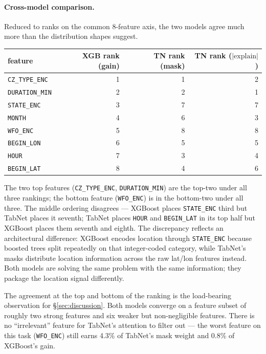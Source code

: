 \documentclass[11pt]{article}
\begin{document}
\paragraph{Cross-model comparison.}\label{sec:interp-compare}

Reduced to ranks on the common 8-feature axis, the two models agree
much more than the distribution shapes suggest.

\begin{center}
\small
\begin{tabular}{lrrr}
\toprule
feature & XGB rank (gain) & TN rank (mask) & TN rank ($|\mathrm{explain}|$) \\
\midrule
\texttt{CZ\_TYPE\_ENC}  & 1 & 1 & 2 \\
\texttt{DURATION\_MIN}  & 2 & 2 & 1 \\
\texttt{STATE\_ENC}     & 3 & 7 & 7 \\
\texttt{MONTH}          & 4 & 6 & 3 \\
\texttt{WFO\_ENC}       & 5 & 8 & 8 \\
\texttt{BEGIN\_LON}     & 6 & 5 & 5 \\
\texttt{HOUR}           & 7 & 3 & 4 \\
\texttt{BEGIN\_LAT}     & 8 & 4 & 6 \\
\bottomrule
\end{tabular}
\end{center}

The two top features (\texttt{CZ\_TYPE\_ENC},
\texttt{DURATION\_MIN}) are the top-two under all three rankings;
the bottom feature (\texttt{WFO\_ENC}) is in the bottom-two under
all three. The middle ordering disagrees --- XGBoost places
\texttt{STATE\_ENC} third but TabNet places it seventh; TabNet
places \texttt{HOUR} and \texttt{BEGIN\_LAT} in its top half but
XGBoost places them seventh and eighth. The discrepancy reflects an
architectural difference: XGBoost encodes location through
\texttt{STATE\_ENC} because boosted trees split repeatedly on that
integer-coded category, while TabNet's masks distribute location
information across the raw lat/lon features instead. Both models
are solving the same problem with the same information; they
package the location signal differently.

The agreement at the top and bottom of the ranking is the
load-bearing observation for \S\ref{sec:discussion}. Both models
converge on a feature subset of roughly two strong features and six
weaker but non-negligible features. There is no ``irrelevant''
feature for TabNet's attention to filter out --- the worst feature
on this task (\texttt{WFO\_ENC}) still earns 4.3\% of TabNet's mask
weight and 0.8\% of XGBoost's gain.
\end{document}
